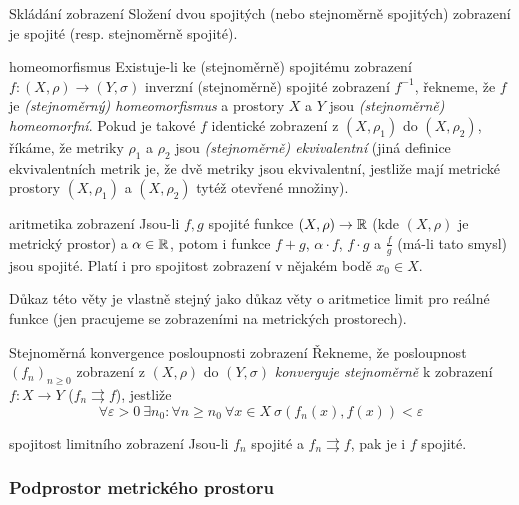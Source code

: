 \begin{vetaN}{Skládání zobrazení}
Složení dvou spojitých (nebo stejnoměrně spojitých) zobrazení je spojité (resp. stejnoměrně spojité).
\end{vetaN}

\begin{definiceN}{homeomorfismus}
Existuje-li ke (stejnoměrně) spojitému zobrazení $f:(X,\rho)\to(Y,\sigma)$ inverzní (stejnoměrně) spojité zobrazení $f^{-1}$, řekneme, že $f$ je \emph{(stejnoměrný) homeomorfismus} a prostory $X$ a $Y$ jsou \emph{(stejnoměrně) homeomorfní}. Pokud je takové $f$ identické zobrazení z $(X,\rho_1)$ do $(X,\rho_2)$, říkáme, že metriky $\rho_1$ a $\rho_2$ jsou \emph{(stejnoměrně) ekvivalentní} (jiná definice ekvivalentních metrik je, že dvě metriky jsou ekvivalentní, jestliže mají metrické prostory $(X,\rho_1)$ a $(X,\rho_2)$ tytéž otevřené množiny).
\end{definiceN}

\begin{vetaN}{aritmetika zobrazení}
Jsou-li $f,g$ spojité funkce $(X,\rho)\to\mathbb{R}$ (kde $(X,\rho)$ je metrický prostor) a $\alpha\in\mathbb{R}$, potom i funkce $f+g$, $\alpha\cdot f$, $f\cdot g$ a $\frac{f}{g}$ (má-li tato smysl) jsou spojité. Platí i pro spojitost zobrazení v nějakém bodě $x_0\in X$.

\begin{dukaz}
Důkaz této věty je vlastně stejný jako důkaz věty o aritmetice limit pro reálné funkce (jen pracujeme se zobrazeními na metrických prostorech).
\end{dukaz}
\end{vetaN}

\begin{definiceN}{Stejnoměrná konvergence posloupnosti zobrazení}
Řekneme, že posloupnost $(f_n)_{n\geq 0}$ zobrazení z $(X,\rho)$ do $(Y,\sigma)$ \emph{konverguje stejnoměrně} k zobrazení $f:X\to Y$ ($f_n\rightrightarrows f$), jestliže
$$\forall\varepsilon>0\ \exists n_0:\forall n\geq n_0\ \forall x\in X\ \sigma(f_n(x),f(x))<\varepsilon$$ 
\end{definiceN}

\begin{vetaN}{spojitost limitního zobrazení}
Jsou-li $f_n$ spojité a $f_n\rightrightarrows f$, pak je i $f$ spojité.
\end{vetaN}

\subsubsection*{Podprostor metrického prostoru}

